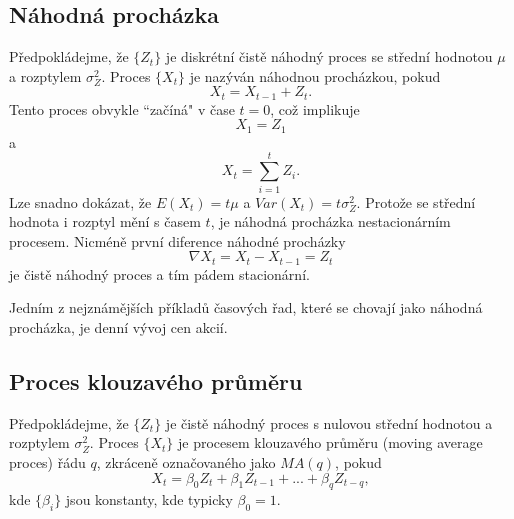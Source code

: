 \subsection{Náhodná procházka}

Předpokládejme, že $\{Z_t\}$ je diskrétní čistě náhodný proces se střední hodnotou $\mu$ a rozptylem $\sigma^2_Z$. Proces $\{X_t\}$ je nazýván náhodnou procházkou, pokud
\begin{equation}
X_t = X_{t - 1} + Z_t.
\end{equation}
Tento proces obvykle ``začíná" v čase $t = 0$, což implikuje
\begin{equation}
X_1 = Z_1
\end{equation}
a
\begin{equation}
X_t = \sum_{i = 1}^t Z_i.
\end{equation}
Lze snadno dokázat, že $E(X_t) = t \mu$ a $Var(X_t) = t \sigma^2_Z$. Protože se střední hodnota i rozptyl mění s časem $t$, je náhodná procházka nestacionárním procesem. Nicméně první diference náhodné procházky
\begin{equation}
\nabla X_t = X_t - X_{t - 1} = Z_t
\end{equation}
je čistě náhodný proces a tím pádem stacionární.

Jedním z nejznámějších příkladů časových řad, které se chovají jako náhodná procházka, je denní vývoj cen akcií.

\subsection{Proces klouzavého průměru}

Předpokládejme, že $\{Z_t\}$ je čistě náhodný proces s nulovou střední hodnotou a rozptylem $\sigma^2_Z$. Proces $\{X_t\}$ je procesem klouzavého průměru (moving average proces) řádu $q$, zkráceně označovaného jako $MA(q)$, pokud
\begin{equation}
X_t = \beta_0 Z_t + \beta_1 Z_{t - 1} + ... + \beta_q Z_{t - q},
\end{equation}
kde $\{\beta_i\}$ jsou konstanty, kde typicky $\beta_0 = 1$.


